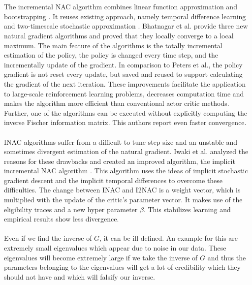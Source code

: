 \\\\
 The incremental NAC algorithm combines linear function approximation and bootstrapping \citep{bhatnagar2008incremental}. It reuses existing approach, namely temporal difference learning \citep{sutton2018reinforcement} and two-timescale stochastic approximation \citep{bhatnagar1998two}. Bhatnagar et al. provide three new natural gradient algorithms and proved that they locally converge to a local maximum. The main feature of the algorithms is the totally incremental estimation of the policy, the policy is changed every time step, and the incrementally update of the gradient. In comparison to Peters et al., the policy gradient is not reset every update, but saved and reused to support calculating the gradient of the next iteration. These improvements facilitate the application to large-scale reinforcement learning problems, decreases computation time and makes the algorithm more efficient than conventional actor critic methods. Further, one of the algorithms can be executed without explicitly computing the inverse Fischer information matrix. This authors report even faster convergence.
\\\\
 INAC algorithms suffer from a difficult to tune step size and an unstable and sometimes divergent estimation of the natural gradient. Iwaki et al. analyzed the reasons for these drawbacks and created an improved algorithm, the implicit incremental NAC algorithm \citep{iwaki2019implicit}. This algorithm uses the ideas of implicit stochastic gradient descent \citep{toulis2014statistical} and the implicit temporal diﬀerences \citep{tamar2014implicit} to overcome these difficulties. The change between INAC and I2NAC is a weight vector, which is multiplied with the update of the critic's parameter vector. It makes use of the eligibility traces and a new hyper parameter $\beta$. This stabilizes learning and empirical results show less divergence.
\\\\
	Even if we find the inverse of $G$, it can be ill defined. An example for this are extremely small eigenvalues which appear due to noise in our data. These eigenvalues will become extremely large if we take the inverse of $G$ and thus the parameters belonging to the eigenvalues will get a lot of credibility which they should not have and which will falsify our inverse.
	\\\\
